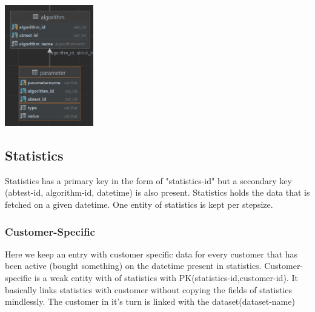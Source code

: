 \documentclass[a4paper,12pt]{article}
\begin{document}
\begin{center}

		\includegraphics[height={200px}]{Parameter.png}

\end{center}		
	\subsection{Statistics}
	Statistics has a primary key in the form of "statistics-id" but a secondary key (abtest-id, algorithm-id, datetime) is also present. Statistics holds the data that is fetched on a given datetime. One entity of statistics is kept per stepsize.
	\subsubsection{Customer-Specific}
	Here we keep an entry with customer specific data for every customer that has been active (bought something) on the datetime present in statistics. Customer-specific is a weak entity with of statistics with PK(statistics-id,customer-id). It basically links statistics with customer without copying the fields of statistics mindlessly. The customer in it's turn is linked with the dataset(dataset-name)
	
\end{document}
